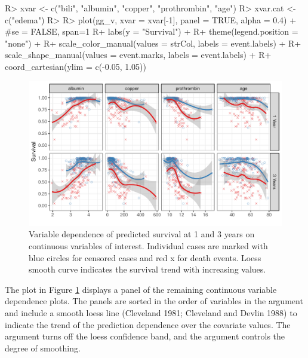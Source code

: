 \documentclass[article]{jss}
\begin{document}
\begin{Schunk}
\begin{Sinput}
R> xvar <- c("bili", "albumin", "copper", "prothrombin", "age")
R> xvar.cat <- c("edema")
R> 
R> plot(gg_v, xvar = xvar[-1], panel = TRUE, alpha = 0.4) + #se = FALSE, span=1
R+   labs(y = "Survival") +
R+   theme(legend.position = "none") +
R+   scale_color_manual(values = strCol, labels = event.labels) +
R+   scale_shape_manual(values = event.marks, labels = event.labels) +
R+   coord_cartesian(ylim = c(-0.05, 1.05))
\end{Sinput}
\begin{figure}[!htb]

{\centering \includegraphics{fig-rfs/rfs-variable-plot-1} 

}

\caption[Variable dependence of predicted survival at 1 and 3 years on continuous variables of interest]{Variable dependence of predicted survival at 1 and 3 years on continuous variables of interest. Individual cases are marked with blue circles for censored cases and red x for death events. Loess smooth curve indicates the survival trend with increasing values.}\label{fig:variable-plot}
\end{figure}
\end{Schunk}

The  plot in Figure \ref{fig:variable-plot} displays a
panel of the remaining continuous variable dependence plots. The panels
are sorted in the order of variables in the  argument and
include a smooth loess line (Cleveland 1981; Cleveland and Devlin 1988)
to indicate the trend of the prediction dependence over the covariate
values. The  argument turns off the loess confidence
band, and the  argument controls the degree of smoothing.
\end{document}
